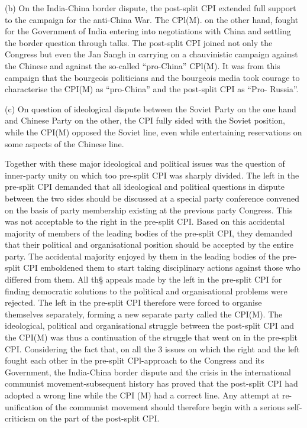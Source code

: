 (b) On the India-China border dispute, the post-split CPI extended full support to the campaign for the anti-China War. The CPl(M). on the other hand, fought for the Government of 
India entering into negotiations with China and settling the border question through talks. The post-split CPI joined not only the Congress but even the Jan Sangh in carrying on a chauvinistic campaign against the Chinese and against the so-called “pro-China” CPl(M). It was from this campaign that the bourgeois politicians and the bourgeois media took courage to characterise the CPI(M) as “pro-China” and the post-split CPI as “Pro- 
Russia”. 

(c) On question of ideological dispute between the Soviet Party on the one hand and Chinese Party on the other, the CPI fully sided with the Soviet position, while the CPI(M) opposed the Soviet line, even while entertaining reservations on some aspects of the Chinese line. 

Together with these major ideological and political issues was the question of inner-party unity on which too pre-split CPI was sharply divided. The left in the pre-split CPI demanded that all ideological and political questions in dispute between the two sides should be discussed at a special party conference convened on the basis of party membership existing at the previous party Congress. This was not acceptable to the right in the pre-split CPI. Based on this accidental majority of members of the leading bodies of the pre-split CPI, they demanded that their political and organisational position should be accepted by the entire party. The accidental majority enjoyed by them in the leading bodies of the pre-split CPI emboldened them to start taking disciplinary actions against those who differed from them. All th§ appeals made by the left in the pre-split CPI for finding democratic solutions to the political and organisational problems were rejected. The left in the pre-split CPI therefore were forced to organise themselves separately, forming a new separate party called the CPI(M). 
The ideological, political and organisational struggle between the post-split CPI and the CPI(M) was thus a continuation of the struggle that went on in the pre-split CPI. Considering the fact that, on all the 3 issues on which the right and the left fought each other in the pre-split CPl-approach to the Congress and its Government, the India-China border dispute and the crisis in the international communist movement-subsequent history has proved that the post-split CPI had adopted a wrong line while the CPI (M) had a correct line. Any attempt at re-unification of the communist movement should therefore begin with a serious self-criticism on the part of the post-split CPI. 

